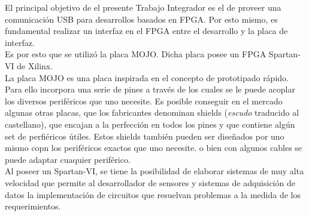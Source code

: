 El principal objetivo de el presente Trabajo Integrador es el de proveer una comunicación USB para desarrollos basados en FPGA. Por esto mismo, es fundamental realizar un interfaz en el FPGA entre el desarrollo y la placa de interfaz.\\

Es por esto que se utilizó la placa MOJO. Dicha placa posee un FPGA Spartan-VI de Xilinx.\\

La placa MOJO es una placa inspirada en el concepto de prototipado rápido. Para ello incorpora una serie de pines a través de los cuales se le puede acoplar los diversos periféricos que uno necesite. Es posible conseguir en el mercado algunas otras placas, que los fabricantes denominan shields ({\it escudo} traducido al castellano), que encajan a la perfección en todos los pines y que contiene algún set de perfiéricos útiles. Estos shields también pueden ser diseñados por uno mismo copn los periféricos exactos que uno necesite. o bien con algunos cables se puede adaptar cuaquier periférico.\\

Al poseer un Spartan-VI, se tiene la posibilidad de elaborar sistemas de muy alta velocidad que permite al desarrollador de sensores y sistemas de adquisición de datos la implementación de circuitos que resuelvan problemas a la medida de los requerimientos.\\